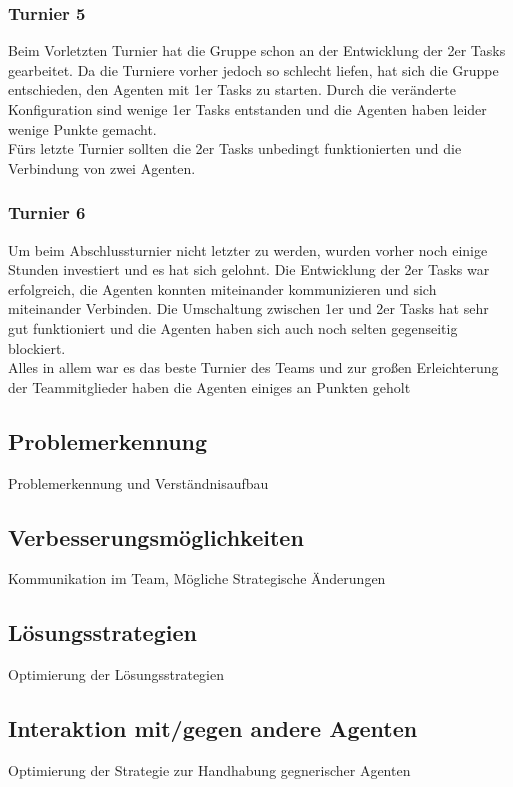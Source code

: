 \subsubsection{Turnier 5}
Beim Vorletzten Turnier hat die Gruppe schon an der Entwicklung der 2er Tasks gearbeitet. Da die Turniere vorher jedoch so schlecht liefen, hat sich die Gruppe entschieden, den Agenten mit 1er Tasks zu starten. Durch die veränderte Konfiguration sind wenige 1er Tasks entstanden und die Agenten haben leider wenige Punkte gemacht. \\
Fürs letzte Turnier sollten die 2er Tasks unbedingt funktionierten und die Verbindung von zwei Agenten.

\subsubsection{Turnier 6}
Um beim Abschlussturnier nicht letzter zu werden, wurden vorher noch einige Stunden investiert und es hat sich gelohnt. Die Entwicklung der 2er Tasks war erfolgreich, die Agenten konnten miteinander kommunizieren und sich miteinander Verbinden. Die Umschaltung zwischen 1er und 2er Tasks hat sehr gut funktioniert und die Agenten haben sich auch noch selten gegenseitig blockiert. \\
Alles in allem war es das beste Turnier des Teams und zur großen Erleichterung der Teammitglieder haben die Agenten einiges an Punkten geholt

\subsection{Problemerkennung}
Problemerkennung und Verständnisaufbau

\subsection{Verbesserungsmöglichkeiten}
Kommunikation im Team, Mögliche Strategische Änderungen

\subsection{Lösungsstrategien}
Optimierung der Lösungsstrategien

\subsection{Interaktion mit/gegen andere Agenten}
Optimierung der Strategie zur Handhabung gegnerischer Agenten
